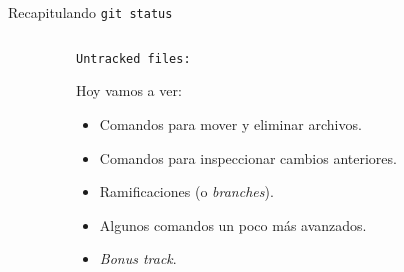 \begin{frame}[t]{Recapitulando}
    \texttt{git status}
    \vspace{.4em}

    \begin{columns}[t]
        \begin{column}{0.05\textwidth}

        \end{column}
        \begin{column}{0.90\textwidth}
            \hspace{-.25em}\texttt{Untracked files:}

            \pause
            \begin{block}{Hoy vamos a ver:}
                \begin{itemize}
                    \item Comandos para mover y eliminar archivos.
                    \item Comandos para inspeccionar cambios anteriores.
                    \item Ramificaciones (o \textit{branches}).
                    \item Algunos comandos un poco más avanzados.
                    \item \textit{Bonus track}.
                \end{itemize}
            \end{block}

        \end{column}
        \begin{column}{0.05\textwidth}

        \end{column}
    \end{columns}

\end{frame}
